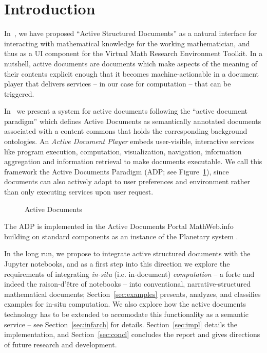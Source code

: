 \section{Introduction}\label{sec:intro}

In~, we have proposed ``Active Structured Documents'' as a natural interface for interacting
with mathematical knowledge for the working mathematician, and thus as a UI component for
the \pn Virtual Math Research Environment Toolkit.
%
In a nutshell, active documents are documents which make aspects of the meaning of their
contents explicit enough that it becomes machine-actionable in a document player that
delivers services -- in our case for computation -- that can be triggered.

In~\cite{KohDavGin:psewads11} we present a system for active documents following the
``active document paradigm'' which defines Active Documents as semantically annotated
documents associated with a content commons that holds the corresponding background
ontologies. An \textit{Active Document Player} embeds user-visible, interactive services
like program execution, computation, visualization, navigation, information aggregation
and information retrieval to make documents executable. We call this framework the Active
Documents Paradigm (ADP; see Figure~\ref{fig:activedocs}), since documents can also
actively adapt to user preferences and environment rather than only executing services
upon user request.
\begin{figure}[ht]\centering
  
  \caption{Active Documents}\label{fig:activedocs} 
\end{figure} 

The ADP is implemented in the Active Documents Portal MathWeb.info~\cite{MathHub:on}
building on standard components as an instance of the Planetary system
\cite{Kohlhase:ppte12}.

In the long run, we propose to integrate active structured documents with the Jupyter
notebooks, and as a first step into this direction we explore the requirements of
integrating \emph{in-situ} (i.e. in-document) \emph{computation} -- a forte and indeed
the raison-d'être of notebooks -- into conventional, narrative-structured mathematical
documents; Section~\ref{sec:examples} presents, analyzes, and classifies examples for
in-situ computation.  We also explore how the active documents technology has to be
extended to accomodate this functionality as a semantic service -- see
Section~\ref{sec:infarch} for details. Section~\ref{sec:impl} details the implementation,
and Section~\ref{sec:concl} concludes the report and gives directions of future research
and development.


